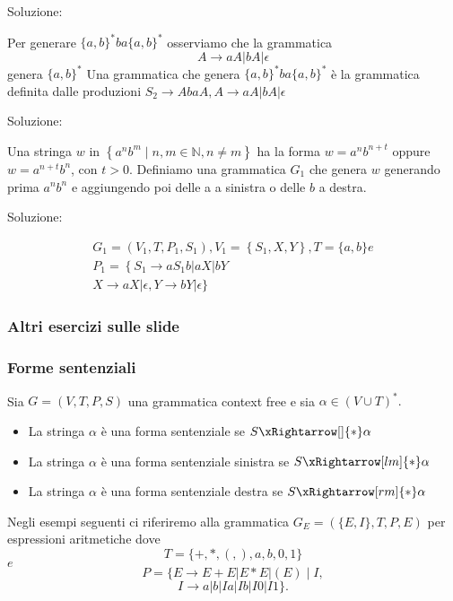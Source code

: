 Soluzione:

Per generare $\{a, b\}^{*} b a\{a, b\}^{*}$ osserviamo che la grammatica
$$
A \rightarrow a A|b A| \epsilon
$$
genera $\{a, b\}^{*}$
Una grammatica che genera $\{a, b\}^{*} b a\{a, b\}^{*}$ è la grammatica definita dalle produzioni
$S_{2} \rightarrow A b a A, A \rightarrow a A|b A| \epsilon$

Soluzione:

Una stringa $w$ in $\left\{a^{n} b^{m} \mid n, m \in \mathbb{N}, n \neq m\right\}$ ha la forma $w=a^{n} b^{n+t}$ oppure $w=a^{n+t} b^{n}$, con $t>0 .$
Definiamo una grammatica $G_{1}$ che genera $w$ generando prima $a^{n} b^{n}$ e aggiungendo poi delle a a sinistra o delle $b$ a destra.

Soluzione:

$$
\begin{array}{r}
G_{1}=\left(V_{1}, T, P_{1}, S_{1}\right), V_{1}=\left\{S_{1}, X, Y\right\}, T=\{a, b\} e \\
P_{1}=\left\{S_{1} \rightarrow a S_{1} b|a X| b Y\right. \\
X \rightarrow a X|\epsilon, Y \rightarrow b Y| \epsilon\}
\end{array}
$$

\subsubsection{Altri esercizi sulle slide}

\vspace{10mm}

\subsubsection{Forme sentenziali}
Sia $G=(V, T, P, S)$ una grammatica context free e sia $\alpha \in(V \cup T)^{*} .$
\begin{itemize}
    \item La stringa $\alpha$ è una forma sentenziale se $S \xRightarrow[]{*} \alpha$
    \item La stringa $\alpha$ è una forma sentenziale sinistra se $S \xRightarrow[lm]{*} \alpha$
    \item La stringa $\alpha$ è una forma sentenziale destra se $S \xRightarrow[rm]{*} \alpha$
\end{itemize}


Negli esempi seguenti ci riferiremo alla grammatica $G_{E}=(\{E, I\}, T, P, E)$ per espressioni aritmetiche dove
$$
T=\{+, *,(,), a, b, 0,1\}
$$
$e$
$$
P=
\{E \rightarrow E+E|E * E|(E) \mid I,
$$
$$
I \rightarrow a|b| Ia| Ib|I0| I1\}.
$$

